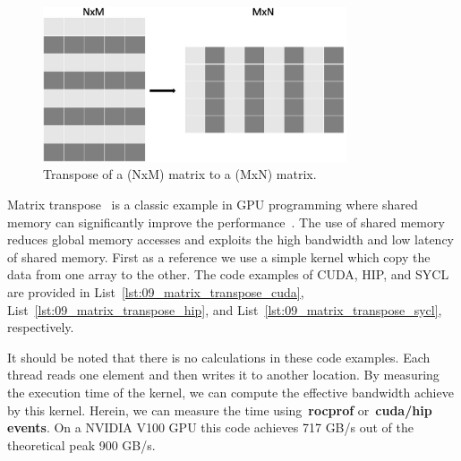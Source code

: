 \begin{figure}[htbp]
\centering\includegraphics[width=0.8\textwidth]{fig_problem/matrix_transpose_2d.jpg}
\caption{Transpose of a (NxM) matrix to a (MxN) matrix.}\label{fig:matrix_transpose}
\end{figure}


\par
Matrix transpose~\cite{matrix_transpose} is a classic example in GPU programming where shared memory can significantly improve the performance~\cite{matrix_transpose_efficient, matrix_transpose_advanced}.
The use of shared memory reduces global memory accesses and exploits the high bandwidth and low latency of shared memory.
First as a reference we use a simple kernel which copy the data from one array to the other.
The code examples of CUDA, HIP, and SYCL are provided in List~\ref{lst:09_matrix_transpose_cuda}, List~\ref{lst:09_matrix_transpose_hip}, and List~\ref{lst:09_matrix_transpose_sycl}, respectively.











\par
It should be noted that there is no calculations in these code examples.
Each thread reads one element and then writes it to another location.
By measuring the execution time of the kernel, we can compute the effective bandwidth achieve by this kernel.
Herein, we can measure the time using~\textbf{rocprof} or~\textbf{cuda/hip events}.
On a NVIDIA V100 GPU this code achieves 717 GB/s out of the theoretical peak 900 GB/s.


